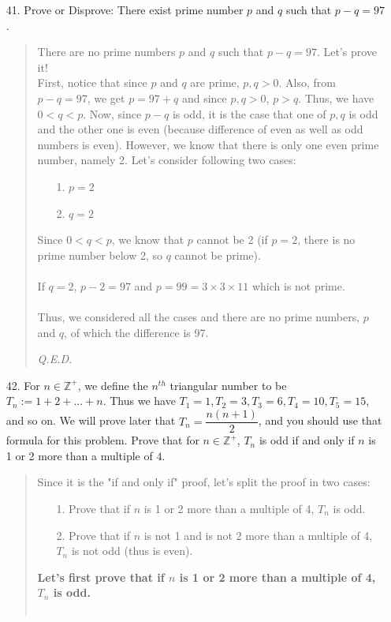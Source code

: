 \documentclass[12pt, a4paper]{article}                      %
\newcommand{\intzp}{\mathbb{Z^+}}
\begin{document}
\begin{itemize}
\item[41.]
Prove or Disprove: There exist prime number $p$ and $q$ such that $p - q = 97$.
\begin{quote}
There are no prime numbers $p$ and $q$ such that $p - q = 97$. Let's prove it!
\\
First, notice that since $p$ and $q$ are prime, $p,q > 0$. Also, from $p - q = 97$,
we get $p = 97 + q$ and since $p,q > 0$, $p > q$. Thus, we have $0 < q  < p$.
Now, since $p - q$ is odd, it is the case that one of $p,q$ is odd and the other one is even
(because difference of even as well as odd numbers is even). However, we know that there is only
one even prime number, namely 2. Let's consider following two cases:
\begin{itemize}
\item[1.]
$p = 2$
\item[2.]
$q = 2$
\\
\end{itemize}
Since $0 < q < p$, we know that $p$ cannot be 2 (if $p = 2$,
there is no prime number below 2, so $q$ cannot be prime).
\\\\
If $q = 2$, $p - 2 = 97$ and $p = 99 = 3 \times 3 \times 11$ which is not prime.
\\\\
Thus, we considered all the cases and there are no prime numbers, $p$ and $q$,
of which the difference is 97.
\begin{flushright}
\textit{Q.E.D.}
\end{flushright}
\end{quote}
\item[42.]
For $n \in \intzp$, we define the $n^{th}$ triangular number to be $T_n := 1 + 2 + ... + n$.
Thus we have $T_1 = 1, T_2 = 3, T_3 = 6, T_4 = 10, T_5 = 15$, and so on. We will prove later
that $T_n = \dfrac{n(n+1)}{2}$, and you should use that formula for this problem. Prove that
for $n \in \intzp$, $T_n$ is odd if and only if $n$ is 1 or 2 more than a multiple of $4$.
\begin{quote}
Since it is the "if and only if" proof, let's split the proof in two cases:
\begin{itemize}
\item[1.]
Prove that if $n$ is 1 or 2 more than a multiple of 4, $T_n$ is odd.
\item[2.]
Prove that if $n$ is not 1 and is not 2 more than a multiple of 4, $T_n$ is not odd (thus is even).
\end{itemize}
\textbf{Let's first prove that if $n$ is 1 or 2 more than a multiple of 4, $T_n$ is odd.}\\\\

\end{quote}
\end{itemize}
\end{document}
